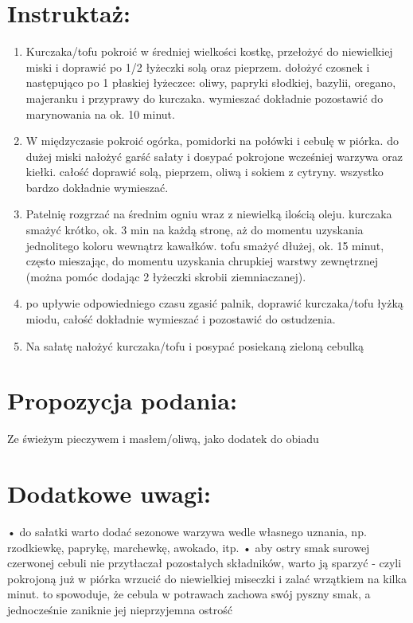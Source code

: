 \documentclass[a4paper,10pt]{book}
\begin{document}
\section*{Instruktaż:}
\begin{enumerate}
    \item Kurczaka/tofu pokroić w średniej wielkości kostkę, przełożyć do niewielkiej miski i doprawić po 1/2 łyżeczki solą oraz pieprzem. dołożyć czosnek i następująco po 1 płaskiej łyżeczce: oliwy, papryki słodkiej, bazylii, oregano, majeranku i przyprawy do kurczaka. wymieszać dokładnie pozostawić do marynowania na ok. 10 minut. 
    \item W międzyczasie pokroić ogórka, pomidorki na połówki i cebulę w piórka. do dużej miski nałożyć garść sałaty i dosypać pokrojone wcześniej warzywa oraz kiełki. całość doprawić solą, pieprzem, oliwą i sokiem z cytryny. wszystko bardzo dokładnie wymieszać.
    \item Patelnię rozgrzać na średnim ogniu wraz z niewielką ilością oleju. kurczaka smażyć krótko, ok. 3 min na każdą stronę, aż do momentu uzyskania jednolitego koloru wewnątrz kawałków. tofu smażyć dłużej, ok. 15 minut, często mieszając, do momentu uzyskania chrupkiej warstwy zewnętrznej (można pomóc dodając 2 łyżeczki skrobii ziemniaczanej). 
    \item po upływie odpowiedniego czasu zgasić palnik, doprawić kurczaka/tofu łyżką miodu, całość dokładnie wymieszać i pozostawić do ostudzenia.
    \item Na sałatę nałożyć kurczaka/tofu i posypać posiekaną zieloną cebulką
\end{enumerate}

\vspace{0.5cm} 

\small
\section*{Propozycja podania:}
Ze świeżym pieczywem i masłem/oliwą, jako dodatek do obiadu

\vspace{0.3cm}

\section*{Dodatkowe uwagi:}
• do sałatki warto dodać sezonowe warzywa wedle własnego uznania, np. rzodkiewkę, paprykę, marchewkę, awokado, itp. 
 • aby ostry smak surowej czerwonej cebuli nie przytłaczał pozostałych składników, warto ją sparzyć - czyli pokrojoną już w piórka wrzucić do niewielkiej miseczki i zalać wrzątkiem na kilka minut. to spowoduje, że cebula w potrawach zachowa swój pyszny smak, a jednocześnie zaniknie jej nieprzyjemna ostrość
\end{document}

